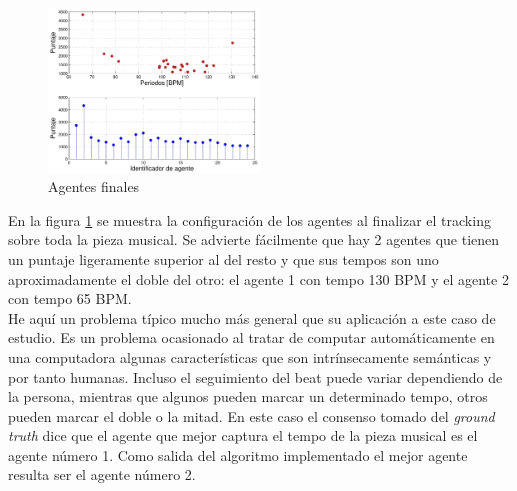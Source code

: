\documentclass[12pt,a4paper,titlepage]{report}
\begin{document}
\begin{figure}
	\vspace{-25pt}
	\begin{center}
	\includegraphics[width=0.5\textwidth]{./pics/datos_2_14_A_agents.pdf}
	\end{center}
	\vspace{-20pt}
	\caption{Agentes finales}
	\label{fig:datos_2_14_A_agents}
	\vspace{-35pt}
\end{figure}

En la figura \ref{fig:datos_2_14_A_agents} se muestra la configuración de los agentes al finalizar el tracking sobre toda la pieza musical. Se advierte fácilmente que hay 2 agentes que tienen un puntaje ligeramente superior al del resto y que sus tempos son uno aproximadamente el doble del otro: el agente 1 con tempo 130 BPM y el agente 2 con tempo 65 BPM.\\

He aquí un problema típico mucho más general que su aplicación a este caso de estudio. Es un problema ocasionado al tratar de computar automáticamente en una computadora algunas características que son intrínsecamente semánticas y por tanto humanas. Incluso el seguimiento del beat puede variar dependiendo de la persona, mientras que algunos pueden marcar un determinado tempo, otros pueden marcar el doble o la mitad. En este caso el consenso tomado del \emph{ground truth} dice que el agente que mejor captura el tempo de la pieza musical es el agente número 1. Como salida del algoritmo implementado el mejor agente resulta ser el agente número 2.\\
\end{document}
